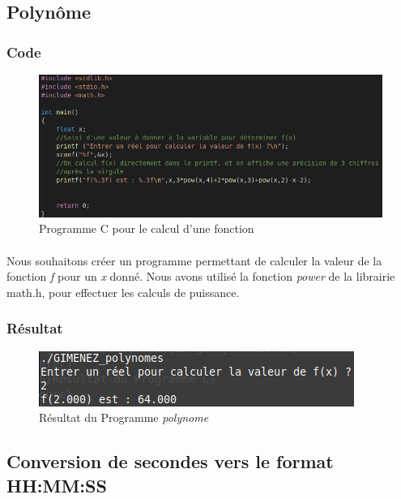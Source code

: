 \documentclass[10pt,a4paper]{article}
\begin{document}
\subsection{Polynôme}
\subsubsection{Code}
	\begin{figure}[h]
	\begin{center}
	\includegraphics[scale=.3]{images/polynome_c}
	\end{center}
	\caption{Programme C pour le calcul d'une fonction}
	\end{figure}
\paragraph{}
	Nous souhaitons créer un programme permettant de calculer la valeur de la fonction 
	\emph{f} pour un \emph{x} donné. Nous avons utilisé la fonction \emph{power} de la librairie 
	math.h, pour effectuer les calculs de puissance.   
\subsubsection{Résultat}
	\begin{figure}[h]
	\begin{center}
	\includegraphics[scale=.3]{images/polynome_ex}
	\end{center}
	\caption{Résultat du Programme \emph{polynome}}
	\end{figure}


\subsection{Conversion de secondes vers le format HH:MM:SS}
\end{document}
